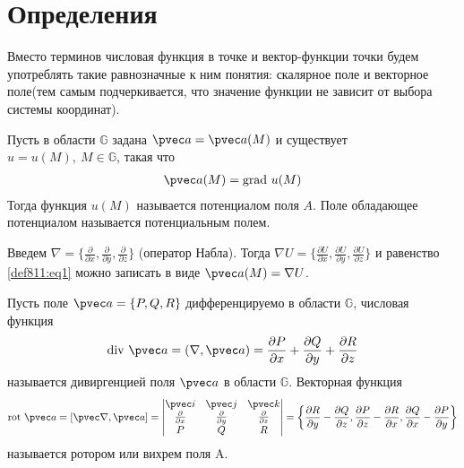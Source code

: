 \section{Определения}
Вместо терминов числовая функция в точке и вектор-функции точки будем
употреблять такие равнозначные к ним понятия: скалярное поле и векторное
поле(тем самым подчеркивается, что значение функции не зависит от выбора
системы координат).

\begin{definition}
  Пусть в области $\mathbb{G}$ задана $\pvec a = \pvec a(M)$ и существует $u =
  u(M), \ M \in \mathbb{G}$, такая что
  \begin{gather}
    \pvec a(M) = \mbox{grad} \ u(M)
    \label{def811:eq1}
  \end{gather}
  Тогда функция $u(M)$ называется потенциалом поля $A$. Поле обладающее
  потенциалом называется потенциальным полем.
\end{definition}

Введем $\nabla = \{\frac{\partial}{\partial x}, \frac{\partial}{\partial y},
\frac{\partial}{\partial z}\}$ (оператор Набла). Тогда $\nabla U =
\{\frac{\partial U}{\partial x}, \frac{\partial U}{\partial y},
\frac{\partial U}{\partial z}\}$ и равенство \eqref{def811:eq1} можно записать
в виде $\pvec a(M) = \nabla U$.

\begin{definition}
  Пусть поле $\pvec a = \{P, Q, R\}$ дифференцируемо в области $\mathbb{G}$,
  числовая функция
  \begin{gather*}
    \mbox{div} \ \pvec a = (\nabla, \pvec a) = \frac{\partial P}{\partial x} +
    \frac{\partial Q}{\partial y} + \frac{\partial R}{\partial z}
  \end{gather*}
  называется дивиргенцией поля $\pvec a$ в области $\mathbb{G}$.
  Векторная функция
  \begin{gather*}
    \mbox{rot} \ \pvec a = [\pvec \nabla, \pvec a] =
    \begin{vmatrix}
      \pvec i & \pvec j & \pvec k \\
      \frac{\partial }{\partial x} & \frac{\partial }{\partial y} &
      \frac{\partial }{\partial z} \\
      P & Q & R
    \end{vmatrix} =
    \left\{\frac{\partial R}{\partial y} - \frac{\partial Q}{\partial z},
    \frac{\partial P}{\partial z} - \frac{\partial R}{\partial x},
    \frac{\partial Q}{\partial x} - \frac{\partial P}{\partial y}\right\}
  \end{gather*}
  называется ротором или вихрем поля A.
\end{definition}

